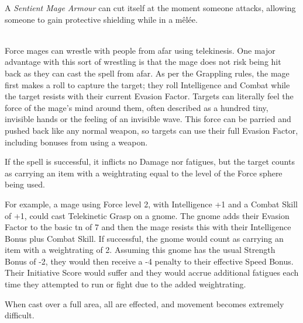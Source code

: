 \begin{multicols}{2}
A \textit{Sentient Mage Armour} can cut itself at the moment someone attacks, allowing someone to gain protective shielding while in a mêlée.

\spelllevel

\\
Force mages can wrestle with people from afar using telekinesis. One major advantage with this sort of wrestling is that the mage does not risk being hit back as they can cast the spell from afar. As per the Grappling rules, the mage first makes a roll to capture the target; they roll Intelligence and Combat while the target resists with their current Evasion Factor. Targets can literally feel the force of the mage's mind around them, often described as a hundred tiny, invisible hands or the feeling of an invisible wave. This force can be parried and pushed back like any normal weapon, so targets can use their full Evasion Factor, including bonuses from using a weapon.

If the spell is successful, it inflicts no Damage nor \glspl{fatigue}, but the target counts as carrying an item with a \gls{weightrating} equal to the level of the Force sphere being used.

For example, a mage using Force level 2, with Intelligence +1 and a Combat Skill of +1, could cast Telekinetic Grasp on a gnome.
The gnome adds their Evasion Factor to the basic \gls{tn} of 7 and then the mage resists this with their Intelligence Bonus plus Combat Skill.
If successful, the gnome would count as carrying an item with a \gls{weightrating} of 2.
Assuming this gnome has the usual Strength Bonus of -2, they would then receive a -4 penalty to their effective Speed Bonus.
Their Initiative Score would suffer and they would accrue additional \glspl{fatigue} each time they attempted to run or fight due to the added \gls{weightrating}.

When cast over a full area, all are effected, and movement becomes extremely difficult.

\end{multicols}


